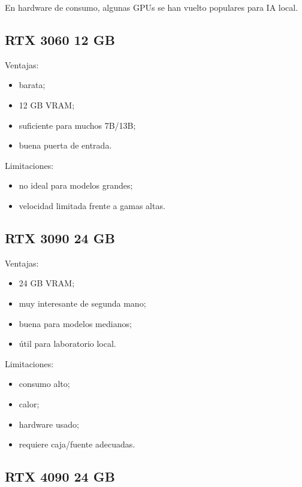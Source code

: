 En hardware de consumo, algunas GPUs se han vuelto populares para IA
local.

\subsection{RTX 3060 12 GB}\label{rtx-3060-12-gb}

Ventajas:

\begin{itemize}
\tightlist
\item
  barata;
\item
  12 GB VRAM;
\item
  suficiente para muchos 7B/13B;
\item
  buena puerta de entrada.
\end{itemize}

Limitaciones:

\begin{itemize}
\tightlist
\item
  no ideal para modelos grandes;
\item
  velocidad limitada frente a gamas altas.
\end{itemize}

\subsection{RTX 3090 24 GB}\label{rtx-3090-24-gb}

Ventajas:

\begin{itemize}
\tightlist
\item
  24 GB VRAM;
\item
  muy interesante de segunda mano;
\item
  buena para modelos medianos;
\item
  útil para laboratorio local.
\end{itemize}

Limitaciones:

\begin{itemize}
\tightlist
\item
  consumo alto;
\item
  calor;
\item
  hardware usado;
\item
  requiere caja/fuente adecuadas.
\end{itemize}

\subsection{RTX 4090 24 GB}\label{rtx-4090-24-gb}

